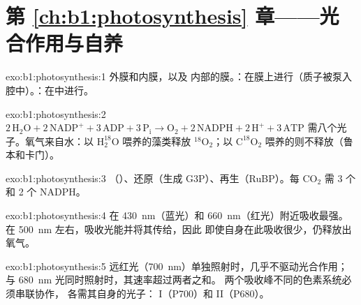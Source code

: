 \section*{第 \ref{ch:b1:photosynthesis} 章——光合作用与自养}

\begin{solution}{exo:b1:photosynthesis:1}
外膜和内膜，以及
内部的膜。：在膜上进行（质子被泵入
腔中）。：在中进行。
\end{solution}

\begin{solution}{exo:b1:photosynthesis:2}
$2\,\mathrm{H_2O} + 2\,\mathrm{NADP^+} + 3\,\mathrm{ADP} + 3\,\mathrm{P_i}
\to \mathrm{O_2} + 2\,\mathrm{NADPH} + 2\,\mathrm{H^+} + 3\,\mathrm{ATP}$
需八个光子。氧气来自水：以
$\mathrm{H_2^{18}O}$ 喂养的藻类释放 $\mathrm{^{18}O_2}$；以
$\mathrm{C^{18}O_2}$ 喂养的则不释放（鲁本和卡门）。
\end{solution}

\begin{solution}{exo:b1:photosynthesis:3}
（）、还原（生成 G3P）、再生（RuBP）。每
$\mathrm{CO_2}$ 需 3 个  和 2 个 NADPH。
\end{solution}

\begin{solution}{exo:b1:photosynthesis:4}
在 \qty{430}{nm}（蓝光）和 \qty{660}{nm}（红光）附近吸收最强。在 \qty{500}{nm}
左右，吸收光能并将其传给，因此
即使自身在此吸收很少，仍释放出氧气。
\end{solution}

\begin{solution}{exo:b1:photosynthesis:5}
远红光（\qty{700}{nm}）单独照射时，几乎不驱动光合作用；
与 \qty{680}{nm} 光同时照射时，其速率超过两者之和。
两个吸收峰不同的色素系统必须串联协作，
各需其自身的光子： I（P700）和
 II（P680）。
\end{solution}

